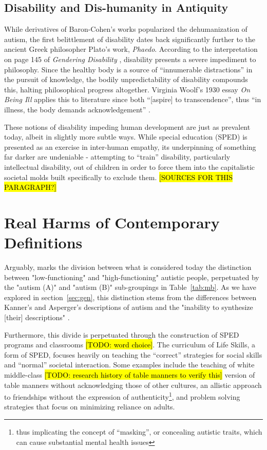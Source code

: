 \documentclass[letterpaper]{article}
\begin{document}
\subsection{Disability and Dis-humanity in Antiquity}
While derivatives of Baron-Cohen's works popularized the dehumanization of autism, the first belittlement of disability dates back significantly further to the ancient Greek philosopher Plato's work, \textit{Phaedo}. According to the interpretation on page 145 of \textit{Gendering Disability} \cite{gendering}, disability presents a severe impediment to philosophy. Since the healthy body is a source of “innumerable distractions” in the pursuit of knowledge, the bodily unpredictability of disability compounds this, halting philosophical progress altogether. Virginia Woolf's 1930 essay \textit{On Being Ill} applies this to literature since both “[aspire] to transcendence”, thus “in illness, the body demands acknowledgement” \cite{gendering}.

These notions of disability impeding human development are just as prevalent today, albeit in slightly more subtle ways. While special education (SPED) is presented as an exercise in inter-human empathy, its underpinning of something far darker are undeniable - attempting to ``train'' disability, particularly intellectual disability, out of children in order to force them into the capitalistic societal molds built specifically to exclude them. \hl{[SOURCES FOR THIS PARAGRAPH?]}

\section{Real Harms of Contemporary Definitions}
Arguably, \cite{vk} marks the division between what is considered today the distinction between "low-functioning" and "high-functioning" autistic people, perpetuated by the "autism (A)" and "autism (B)" sub-groupings in Table~\ref{tab:mb}. As we have explored in section~\ref{sec:gen}, this distinction stems from the differences between Kanner's and Asperger's descriptions of autism and the "inability to synthesize [their] descriptions" \cite[p.~222]{eyal}.

Furthermore, this divide is perpetuated through the construction of SPED programs and classrooms \hl{[TODO: word choice]}. The curriculum of Life Skills, a form of SPED, focuses heavily on teaching the ``correct'' strategies for social skills and ``normal'' societal interaction. Some examples include the teaching of white middle-class \hl{[TODO: research history of table manners to verify this]} version of table manners without acknowledging those of other cultures, an allistic approach to friendships without the expression of authenticity\footnote{thus implicating the concept of ``masking'', or concealing autistic traits, which can cause substantial mental health issues}, and problem solving strategies that focus on minimizing reliance on adults.
\end{document}
